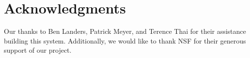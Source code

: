 \documentclass{sig-alternate}
\begin{document}
















\section{Acknowledgments}

Our thanks to Ben Landers, Patrick Meyer, and Terence Thai for their assistance building this system. Additionally, we would like to thank NSF for their generous support of our project.


  
\end{document}

